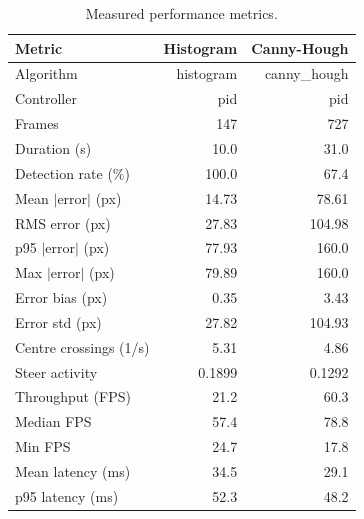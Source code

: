 \begin{table}[htbp]
\centering
\caption{Measured performance metrics.}
\label{tab:results}
\begin{tabular}{lrr}
\hline
Metric & Histogram & Canny-Hough \\
\hline
Algorithm & histogram & canny_hough \\
Controller & pid & pid \\
Frames & 147 & 727 \\
Duration (s) & 10.0 & 31.0 \\
Detection rate (\%) & 100.0 & 67.4 \\
Mean $|$error$|$ (px) & 14.73 & 78.61 \\
RMS error (px) & 27.83 & 104.98 \\
p95 $|$error$|$ (px) & 77.93 & 160.0 \\
Max $|$error$|$ (px) & 79.89 & 160.0 \\
Error bias (px) & 0.35 & 3.43 \\
Error std (px) & 27.82 & 104.93 \\
Centre crossings (1/s) & 5.31 & 4.86 \\
Steer activity & 0.1899 & 0.1292 \\
Throughput (FPS) & 21.2 & 60.3 \\
Median FPS & 57.4 & 78.8 \\
Min FPS & 24.7 & 17.8 \\
Mean latency (ms) & 34.5 & 29.1 \\
p95 latency (ms) & 52.3 & 48.2 \\
\hline
\end{tabular}
\end{table}
